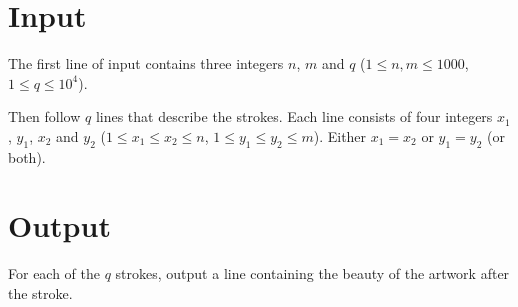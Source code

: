 \section*{Input}

The first line of input contains three integers $n$, $m$ and $q$
($1 \le n,m \le 1000$, $1 \le q \le 10^4$).

Then follow $q$ lines that describe the strokes.
Each line consists of four integers $x_1$, $y_1$, $x_2$ and $y_2$
($1 \le x_1 \le x_2 \le n$, $1 \le y_1 \le y_2 \le m$).  Either $x_1 = x_2$ or $y_1 = y_2$ (or both).

\section*{Output}

For each of the $q$ strokes, output a line containing the beauty of the artwork after the stroke.
